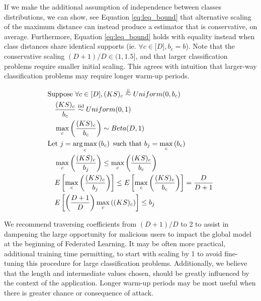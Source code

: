 \documentclass{article} %
\newcommand{\indep}{\perp \!\!\! \perp}
\begin{document}
If we make the additional assumption of independence between classes distributions, we can show, see Equation \ref{eq:leq_bound} that alternative scaling of the maximum distance can instead produce a estimator that is conservative, on average. Furthermore, Equation \ref{eq:leq_bound} holds with equality instead when class distances share identical supports (ie. $\forall c \in \mathopen[ D \mathclose], b_c = b$). Note that the conservative scaling $(D + 1) / D \in \mathopen(1, \mathclose 1.5]$, and that larger classification problems require smaller initial scaling. This agrees with intuition that larger-way classification problems may require longer warm-up periods. 

\begin{align}
    & \textrm{Suppose } \forall c \in \mathopen[ D \mathclose], (KS)_c \overset{\indep}{\sim} Uniform(0, b_c) \nonumber \\
    & \quad \dfrac{(KS)_c}{b_c} \overset{\mathrm{iid}}{\sim} Uniform(0, 1) \nonumber \\
    & \quad \max_c \left( \dfrac{(KS)_c}{b_c} \right) \sim Beta(D, 1) \nonumber \\
    & \textrm{Let } j = \argmax_c \left( b_c \right) \textrm{ such that } b_j = \max_c \left( b_c \right) \nonumber \\
    & \quad \max_c \left( \dfrac{(KS)_c}{b_j} \right) \leq \max_c \left( \dfrac{(KS)_c}{b_c} \right) \nonumber \\
    & \quad E \left[ \max_c \left( \dfrac{(KS)_c}{b_j} \right) \right] \leq E \left[ \max_c \left( \dfrac{(KS)_c}{b_c} \right) \right] = \dfrac{D}{D + 1} \nonumber \\
    & \quad E \left[ \left( \dfrac{D + 1}{D} \right) \max_c \left( (KS)_c \right) \right] \leq b_j \label{eq:leq_bound}
\end{align}

We recommend traversing coefficients from $(D + 1) / D$ to 2 to assist in dampening the large opportunity for malicious users to impact the global model at the beginning of Federated Learning. It may be often more practical, additional training time permitting, to start with scaling by 1 to avoid fine-tuning this procedure for large classification problems. Additionally, we believe that the length and intermediate values chosen, should be greatly influenced by the context of the application. Longer warm-up periods may be most useful when there is greater chance or consequence of attack.
\end{document}
